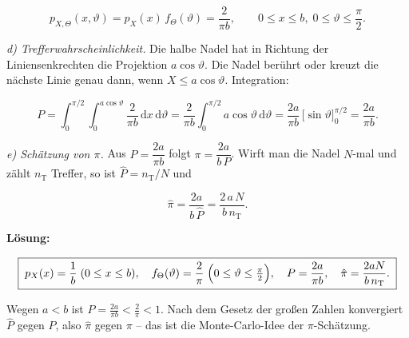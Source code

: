 \begin{beispiel}
$$
p_{X,\Theta}(x,\vartheta) = p_X(x)\, f_\Theta(\vartheta) = \frac{2}{\pi b},
\qquad 0 \leq x \leq b,\; 0 \leq \vartheta \leq \frac{\pi}{2}.
$$

\emph{d) Trefferwahrscheinlichkeit.} Die halbe Nadel hat in Richtung der
Liniensenkrechten die Projektion $a\cos\vartheta$. Die Nadel berührt oder kreuzt
die nächste Linie genau dann, wenn $X \leq a\cos\vartheta$. Integration:

$$
P = \int_0^{\pi/2}\!\!\int_0^{a\cos\vartheta} \frac{2}{\pi b}\,\mathrm{d}x\,\mathrm{d}\vartheta
= \frac{2}{\pi b}\int_0^{\pi/2} a\cos\vartheta\,\mathrm{d}\vartheta
= \frac{2a}{\pi b}\,\bigl[\sin\vartheta\bigr]_0^{\pi/2} = \frac{2a}{\pi b}.
$$

\emph{e) Schätzung von $\pi$.} Aus $P = \dfrac{2a}{\pi b}$ folgt
$\pi = \dfrac{2a}{b\,P}$. Wirft man die Nadel $N$-mal und zählt $n_{\text{T}}$
Treffer, so ist $\hat P = n_{\text{T}}/N$ und

$$
\hat\pi = \frac{2a}{b\,\hat P} = \frac{2\,a\,N}{b\,n_{\text{T}}}.
$$

\textbf{Lösung:}

$$
\boxed{\;p_X(x) = \frac{1}{b}\;(0\le x\le b), \quad
f_\Theta(\vartheta) = \frac{2}{\pi}\;\Bigl(0\le\vartheta\le\tfrac{\pi}{2}\Bigr),
\quad P = \frac{2a}{\pi b}, \quad
\hat\pi = \frac{2aN}{b\,n_{\text{T}}}.\;}
$$

Wegen $a < b$ ist $P = \tfrac{2a}{\pi b} < \tfrac{2}{\pi} < 1$. Nach dem Gesetz
der großen Zahlen konvergiert $\hat P$ gegen $P$, also $\hat\pi$ gegen $\pi$ --
das ist die Monte-Carlo-Idee der $\pi$-Schätzung.

\begin{center}
\end{center}

\end{beispiel}

